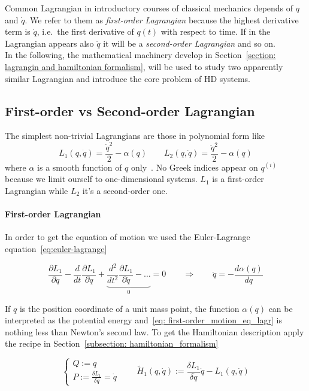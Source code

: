 Common Lagrangian in introductory courses of classical mechanics depends of $q$
and $\dot{q}$. We refer to them as \emph{first-order Lagrangian} because the
highest derivative term is $\dot{q}$, i.e.\ the first derivative of $q(t)$ with
respect to time. If in the Lagrangian appears also $\ddot{q}$ it will be a
\emph{second-order Lagrangian} and so on. \\

In the following, the mathematical machinery develop in Section~\ref{section:
lagrangin and hamiltonian formalism}, will be used to study two apparently
similar Lagrangian and introduce the core problem of HD systems.

\subsection{First-order vs Second-order Lagrangian}
The simplest non-trivial Lagrangians are those in polynomial form like
\begin{equation*}
  L_1(q, \dot{q}) = \frac{\dot{q}^2}{2} - \alpha(q) \qquad
  L_2(q, \ddot{q}) = \frac{\ddot{q}^2}{2} - \alpha(q)
\end{equation*}
where $\alpha$ is a smooth function of $q$ only~\cite{Chen13}. No Greek indices
appear on $q^{(i)}$ because we limit ourself to one-dimensional systems. $L_1$
is a first-order Lagrangian while $L_2$ it's a second-order one.

\paragraph{First-order Lagrangian} In order to get the equation of motion we
used the Euler-Lagrange equation~\eqref{eq:euler-lagrange}

\begin{equation} \label{eq: first-order_motion_eq_lagr}
  \frac{\partial L_1}{\partial q} -
  \frac{d}{dt}\frac{\partial L_1}{\partial \dot{q}} +
  \underbrace{
  \frac{d^2}{dt^2}\frac{\partial L_1}{\partial \ddot{q}} - \ldots }_0 = 0
  \qquad \Rightarrow \qquad
  \ddot{q} = - \frac{d\alpha(q)}{dq}
\end{equation}

If $q$ is the position coordinate of a unit mass point, the function $\alpha(q)$
can be interpreted as the potential energy and~\eqref{eq:
first-order_motion_eq_lagr} is nothing less than Newton's second law. To get the
Hamiltonian description apply the recipe in Section~\ref{subsection:
hamiltonian_formalism}

\begin{equation*}
  \begin{cases}
    Q := q \\
    P := \frac{\delta L_1}{\delta \dot{q}} = \dot{q}
  \end{cases}
  \qquad
  \tilde{H}_1(q, \dot{q}) :=
  \frac{\delta L_1}{\delta \dot{q}} \dot{q} - L_1(q, \dot{q})
\end{equation*}

